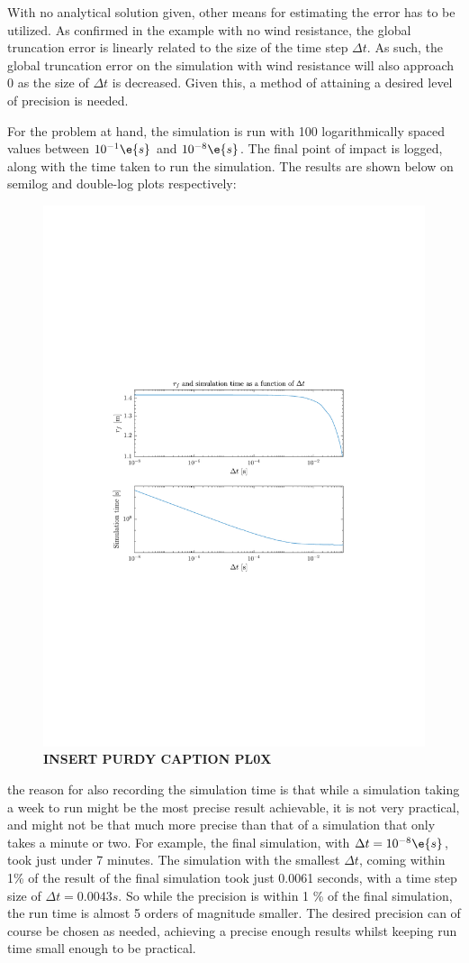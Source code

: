 \documentclass[a4paper,10pt]{article} 	%
\numberwithin{equation}{section}
\begin{document}
 	With no analytical solution given, other means for estimating the error has to be utilized. As confirmed in the example with no wind resistance, the global truncation error is linearly related to the size of the time step $ \Delta t $. As such, the global truncation error on the simulation with wind resistance will also approach 0 as the size of $ \Delta t $ is decreased. Given this, a method of attaining a desired level of precision is needed.
 	
 	For the problem at hand, the simulation is run with 100 logarithmically spaced values between $ 10^{-1} \e{s}$ and $ 10^{-8} \e{s} $. The final point of impact is logged, along with the time taken to run the simulation. The results are shown below on semilog and double-log plots respectively:
 	\begin{figure}[H]
 		\centering
 		\includegraphics[width = 0.7\linewidth]{simtime.pdf}
 		\caption{\textbf{INSERT PURDY CAPTION PL0X}}
 		\label{fig:simtime}
 	\end{figure}
 	the reason for also recording the simulation time is that while a simulation taking a week to run might be the most precise result achievable, it is not very practical, and might not be that much more precise than that of a simulation that only takes a minute or two. For example, the final simulation, with $ \Delta t = 10^{-8} \e{s} $, took just under 7 minutes. The simulation with the smallest $ \Delta t $, coming within 1\% of the result of the final simulation took just 0.0061 seconds, with a time step size of $ \Delta t = 0.0043 s $. So while the precision is within 1 \% of the final simulation, the run time is almost 5 orders of magnitude smaller. The desired precision can of course be chosen as needed, achieving a precise enough results whilst keeping run time small enough to be practical.
 	
\end{document}
